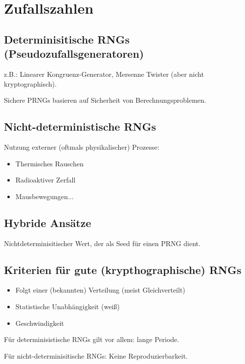 \section{Zufallszahlen}
\subsection{Determinisitische RNGs (Pseudozufallsgeneratoren)}
z.B.: Linearer Kongruenz-Generator, Mersenne Twister (aber nicht kryptographisch).

Sichere PRNGs basieren auf Sicherheit von Berechnungsproblemen.

\subsection{Nicht-deterministische RNGs}
Nutzung externer (oftmals physikalischer) Prozesse:
\begin{itemize}
    \item Thermisches Rauschen
    \item Radioaktiver Zerfall
    \item Mausbewegungen...
\end{itemize}

\subsection{Hybride Ansätze}
Nichtdeterminisitischer Wert, der als Seed für einen PRNG dient.

\subsection{Kriterien für gute (krypthographische) RNGs}
\begin{itemize}
    \item Folgt einer (bekannten) Verteilung (meist Gleichverteilt)
    \item Statistische Unabhängigkeit (weiß)
    \item Geschwindigkeit
\end{itemize}

Für determinisistische RNGs gilt vor allem: lange Periode.

Für nicht-determinisitische RNGs: Keine Reproduzierbarkeit.

